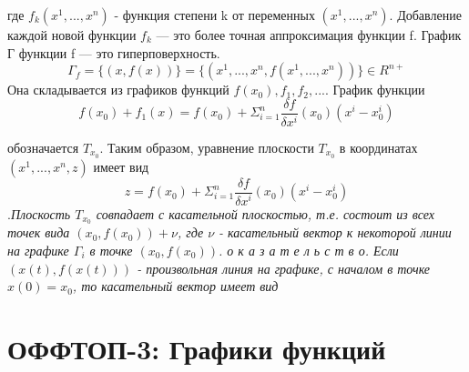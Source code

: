\documentclass[a4paper, 12pt]{report}
\begin{document}
где $f_k(x^1, ...,x^n)$ - функция степени k от переменных $(x^1, ...,x^n)$.\newline
Добавление каждой новой функции $f_k$ — это более точная аппроксимация функции f.\newline
График Г функции f — это гиперповерхность.\newline
\begin{equation}
\Gamma_f=\lbrace(x, f(x))\rbrace=\lbrace(x^1,...,x^n,f(x^1,...,x^n))\rbrace\in R^{n+}
\end{equation}
Она складывается из графиков функций $f(x_0),f_1,f_2,...$.
График функции
\begin{equation}
f(x_0) + f_1(x) = f(x_0)+\Sigma_{i=1}^n\frac{\delta f}{\delta x^i}(x_0)(x^i-x^i_0)
\end{equation}

обозначается $T_{x_0}$.\newline
Таким образом, уравнение плоскости $T_{x_0}$ в координатах $(x^1,...,x^n,z)$ имеет вид
\begin{equation}
z=f(x_0)+\Sigma_{i=1}^n\frac{\delta f}{\delta x^i}(x_0)(x^i-x^i_0)
\end{equation}
.\it Плоскость $T_{x_0}$ совпадает с касательной плоскостью, т.е. состоит из всех точек вида $(x_0, f(x_0))+\nu$, где $\nu$ - касательный вектор к некоторой линии на графике $\Gamma_i$ в точке $(x_0, f(x_0))$.
\newline {} о к а з а т е л ь с т в о. \rm Если $(x(t), f(x(t)))$ - произвольная линия на графике, с началом в точке $x(0) = x_0$, то касательный вектор имеет вид\newline

\chapter{ОФФТОП-3: Графики функций}

\begin{figure}[h]
 \centering
\end{figure}

\begin{figure}[h]
    \centering
\end{figure}
\end{document}
